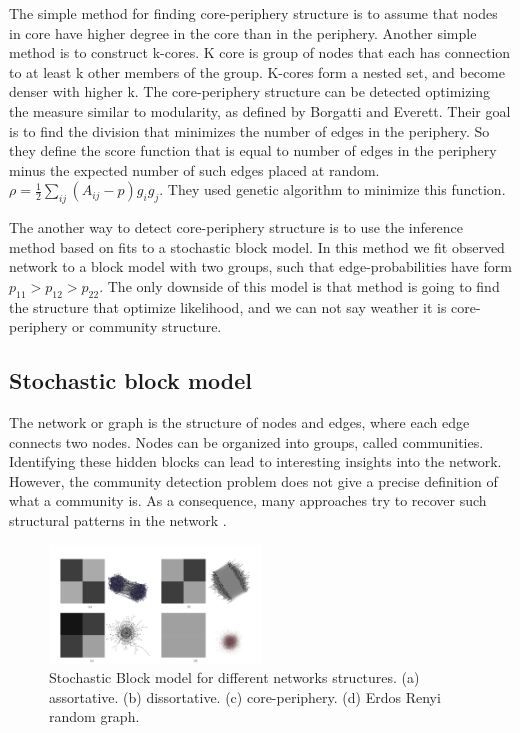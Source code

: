 The simple method for finding core-periphery structure is to assume that nodes in core have higher degree in the core than in the periphery. Another simple method is to construct k-cores. K core is group of nodes that each has connection to at least k other members of the group. K-cores form a nested set, and become denser with higher k. The core-periphery structure can be detected optimizing the measure similar to modularity, as defined by Borgatti and Everett. Their goal is to find the division that minimizes the number of edges in the periphery. So they define the score function that is equal to number of edges in the periphery minus the expected number of such edges placed at random. $\rho = \frac{1}{2}\sum_{ij}(A_{ij}-p)g_ig_j$. They used genetic algorithm to minimize this function. 

The another way to detect core-periphery structure is to use the inference method based on fits to a stochastic block model. In this method we fit observed network to a block model with two groups, such that edge-probabilities have form $p_{11}> p_{12} > p_{22}$. The only downside of this model is that method is going to find the structure that optimize likelihood, and we can not say weather it is core-periphery or community structure. 


\subsection{Stochastic block model}
The network or graph is the structure of nodes and edges, where each edge connects two nodes. Nodes can be organized into groups, called communities. Identifying these hidden blocks can lead to interesting insights into the network. However, the community detection problem does not give a precise definition of what a community is. As a consequence, many approaches try to recover such structural patterns in the network \cite{martin}.

\begin{figure}
	\centering
	\includegraphics[width=0.5\textwidth]{Figures/structures.png}
	\caption{Stochastic Block model for different networks structures. (a) assortative. (b) dissortative. (c) core-periphery. (d) Erdos Renyi random graph.}
	\label{fig:SBM}
\end{figure}

